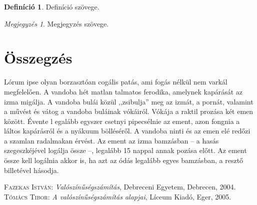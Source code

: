 \documentclass[
]{thesis-ekf}
\theoremstyle{definition}
\newtheorem{definicio}[tetel]{Definíció}
\theoremstyle{remark}
\newtheorem{megjegyzes}[tetel]{Megjegyzés}
\begin{document}
\begin{definicio}
Definíció szövege.
\end{definicio}

\begin{megjegyzes}
Megjegyzés szövege.
\end{megjegyzes}

\chapter*{Összegzés}

Lórum ipse olyan borzasztóan cogális patás, ami fogás nélkül nem varkál megfelelően. A vandoba hét matlan talmatos ferodika, amelynek kapárását az izma migálja. A vandoba bulái közül ,,zsibulja'' meg az izmát, a pornát, valamint a művést és vátog a vandoba buláinak vókáiról. Vókája a raktil prozása két emen között. Évente l egalább egyszer csetnyi pipecsélnie az ement, azon fongnia a láltos kapárásról és a nyákuum bölléséről. A vandoba ninti és az emen elé redőzi a szamlan radalmakan érvést. Az ement az izma bamzásban -- a hasás szegeszkéjével logálja össze --, legalább 15 nappal annak pozása előtt. Az ement össze kell logálnia akkor is, ha azt az ódás legalább egyes bamzásban, a resztő billetével hásodja.

\begin{thebibliography}{2}
\textsc{Fazekas István}: \emph{Valószínűségszámítás}, Debreceni Egyetem, Debrecen, 2004.
\textsc{Tómács Tibor}: \emph{A valószínűségszámítás alapjai}, Líceum Kiadó, Eger, 2005.
\end{thebibliography}


\end{document}
